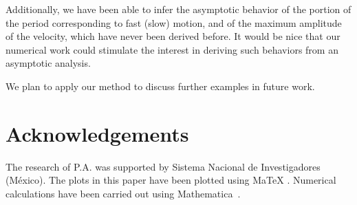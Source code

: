 \documentclass[final]{article}
\begin{document}
Additionally, we have been able to  infer
the asymptotic behavior of the portion of the period corresponding to fast (slow) motion, and of the maximum amplitude of the velocity,
which have never  been derived before. It would be nice that our numerical work could stimulate the interest in deriving such behaviors from an asymptotic analysis. 

We plan to apply our method to discuss further examples in future work.

 
\section*{Acknowledgements}
The research of P.A. was supported by Sistema Nacional de Investigadores (M\'exico). 
The plots in this paper have been plotted using {\rm MaTeX} \cite{szhorvat}. Numerical calculations have been carried out using Mathematica~\cite{wolfram}.
\end{document}
